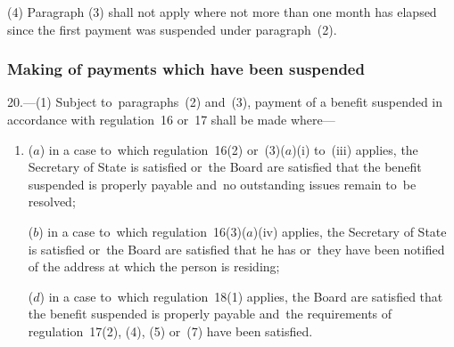 \documentclass[12pt,a4paper]{article}
\begin{document}
(4) Paragraph (3) shall not apply where not more than one month has elapsed since the first payment was suspended under paragraph~(2).


\subsubsection[20. Making of payments which have been suspended]{Making of payments which have been suspended}

20.—(1) Subject to~paragraphs~(2) and~(3), payment of a benefit suspended in accordance with regulation~16 
or~17  %
shall be made where—
\begin{enumerate}\item[]
($a$) in a case to~which regulation~16(2) or~(3)($a$)(i) to~(iii) applies, the Secretary of State is satisfied 
or~the Board are satisfied  %
that the benefit suspended is properly payable and~no outstanding issues remain to~be resolved;

($b$) in a case to~which regulation~16(3)($a$)(iv) applies, the Secretary of State is satisfied 
or~the Board are satisfied  %
that he has 
or~they have  %
been notified of the address at which the person is residing;



($d$) in a case to~which regulation~18(1) applies, the Board are satisfied that the benefit suspended is properly payable and~the requirements of regulation~17(2), (4), (5) or~(7) have been satisfied.
\end{enumerate}
\end{document}
